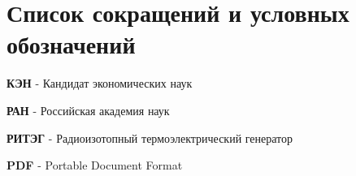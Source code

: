\chapter*{Список сокращений и условных обозначений}             %

\textbf{КЭН} - Кандидат экономических наук

\textbf{РАН} - Российская академия наук

\textbf{РИТЭГ} - Радиоизотопный термоэлектрический генератор

\textbf{PDF} - Portable Document Format

